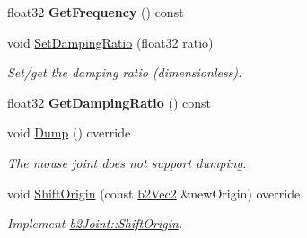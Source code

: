 \begin{DoxyCompactItemize}
float32 {\bfseries Get\+Frequency} () const
\item 
\mbox{\label{classb2MouseJoint_a648c8f3ecb82f4887c0eefcfe48cbd37}} 
void \hyperlink{classb2MouseJoint_a648c8f3ecb82f4887c0eefcfe48cbd37}{Set\+Damping\+Ratio} (float32 ratio)
\begin{DoxyCompactList}\small\item\em Set/get the damping ratio (dimensionless). \end{DoxyCompactList}\item 
\mbox{\label{classb2MouseJoint_a551de1d56a743e71684a1382054c17c9}} 
float32 {\bfseries Get\+Damping\+Ratio} () const
\item 
\mbox{\label{classb2MouseJoint_aea1ff1e5b71ba5630875585cab1e2a96}} 
void \hyperlink{classb2MouseJoint_aea1ff1e5b71ba5630875585cab1e2a96}{Dump} () override
\begin{DoxyCompactList}\small\item\em The mouse joint does not support dumping. \end{DoxyCompactList}\item 
\mbox{\label{classb2MouseJoint_a9b1b2671837495be175e496afb622904}} 
void \hyperlink{classb2MouseJoint_a9b1b2671837495be175e496afb622904}{Shift\+Origin} (const \hyperlink{structb2Vec2}{b2\+Vec2} \&new\+Origin) override
\begin{DoxyCompactList}\small\item\em Implement \hyperlink{classb2Joint_a7804f649e993dc0fd9ae47fde5601f90}{b2\+Joint\+::\+Shift\+Origin}. \end{DoxyCompactList}\end{DoxyCompactItemize}
